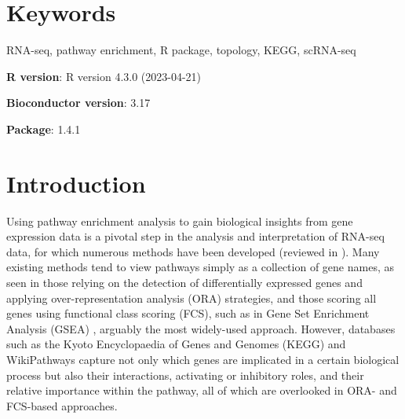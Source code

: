 \documentclass[9pt,a4paper,]{extarticle}
\begin{document}
\section*{Keywords}
RNA-seq, pathway enrichment, R package, topology, KEGG, scRNA-seq


\clearpage
\pagestyle{main}

\textbf{R version}: R version 4.3.0 (2023-04-21)

\textbf{Bioconductor version}: 3.17

\textbf{Package}: 1.4.1

\hypertarget{introduction}{%
\section{Introduction}\label{introduction}}

Using pathway enrichment analysis to gain biological insights from gene expression data is a pivotal step in the analysis and interpretation of RNA-seq data, for which numerous methods have been developed (reviewed in \citep{Maleki2020-ur, Mubeen2022-eq}).
Many existing methods tend to view pathways simply as a collection of gene names, as seen in those relying on the detection of differentially expressed genes and applying over-representation analysis (ORA) strategies, and those scoring all genes using functional class scoring (FCS), such as in Gene Set Enrichment Analysis (GSEA) \citep{Subramanian2005-lx}, arguably the most widely-used approach.
However, databases such as the Kyoto Encyclopaedia of Genes and Genomes (KEGG)\citep{OgataKEGGKyotoEncyclopediaa} and WikiPathways\citep{Martens2021} capture not only which genes are implicated in a certain biological process but also their interactions, activating or inhibitory roles, and their relative importance within the pathway, all of which are overlooked in ORA- and FCS-based approaches.
\end{document}
